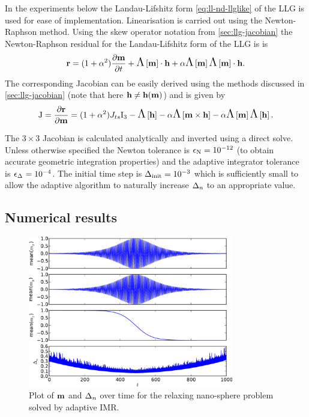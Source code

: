 In the experiments below the Landau-Lifshitz form \cref{eq:ll-nd-llglike} of the LLG is used for ease of implementation.
Linearisation is carried out using the Newton-Raphson method.
Using the skew operator notation from \cref{sec:llg-jacobian} the Newton-Raphson residual for the Landau-Lifshitz form of the LLG is is
\begin{equation}
  \boldsymbol{\mathrm{r}} = (1 + \alpha^2) \frac{\partial \boldsymbol{\mathrm{m}}}{\partial t} + \text{\Large{$\Lambda$}}\left[ \boldsymbol{\mathrm{m}} \right] \cdot \boldsymbol{\mathrm{h}} + \alpha \text{\Large{$\Lambda$}}\left[ \boldsymbol{\mathrm{m}} \right]\text{\Large{$\Lambda$}}\left[ \boldsymbol{\mathrm{m}} \right] \cdot \boldsymbol{\mathrm{h}}.
\end{equation}
The corresponding Jacobian can be easily derived using the methods discussed in \cref{sec:llg-jacobian} (note that here $\boldsymbol{\mathrm{h}} \neq \boldsymbol{\mathrm{h}}(\boldsymbol{\mathrm{m}})$) and is given by
\begin{equation}
  \mathrm{J} = \frac{\partial \boldsymbol{\mathrm{r}}}{\partial \boldsymbol{\mathrm{m}}} = (1 + \alpha^2) J_{ts} \mathrm{I}_3 - \text{\Large{$\Lambda$}}\left[ \boldsymbol{\mathrm{h}} \right] - \alpha \text{\Large{$\Lambda$}}\left[  \boldsymbol{\mathrm{m}} \times \boldsymbol{\mathrm{h}}  \right]
  - \alpha \text{\Large{$\Lambda$}}\left[ \boldsymbol{\mathrm{m}} \right] \text{\Large{$\Lambda$}}\left[ \boldsymbol{\mathrm{h}} \right].
\end{equation}

The $3 \times 3$ Jacobian is calculated analytically and inverted using a direct solve.
Unless otherwise specified the Newton tolerance is $\epsilon_{\mathrm{N}} = 10^{-12}$ (to obtain accurate geometric integration properties) and the adaptive integrator tolerance is $\epsilon_{\Delta_{}} = 10^{-4}$.
The initial time step is $\Delta_{\mathrm{init}} = 10^{-3}$ which is sufficiently small to allow the adaptive algorithm to naturally increase $\Delta_{n}$ to an appropriate value.


\subsection{Numerical results}
\label{sec:aimr-llgode-numerical-results}

\begin{figure}
  \centering
  \includegraphics[width=0.8\textwidth]{plots/aimr-sphere-relax/imr0-meanmxsvs-meanmysvs-meanmzsvs-dtsvstimes.pdf}
  \caption{Plot of $\boldsymbol{\mathrm{m}}$ and $\Delta_{n}$ over time for the relaxing nano-sphere problem solved by adaptive IMR.}
  \label{fig:imr-llg-ode}
\end{figure}

